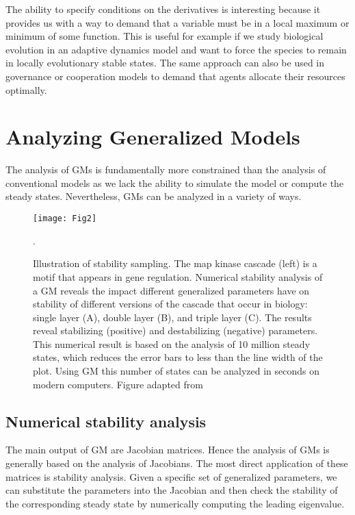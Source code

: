 \documentclass{article}
\begin{document}
The ability to specify conditions on the derivatives is interesting because it provides us with a way to demand that a variable must be in a local maximum or minimum of some function. This is useful for example if we study biological evolution in an adaptive dynamics model \citep{allen2013adaptive} and want to force the species to remain in locally evolutionary stable states. The same approach can also be used in governance or cooperation models to demand that agents allocate their resources optimally.   


\section{Analyzing Generalized Models}\label{secAnalysis}
The analysis of GMs is fundamentally more constrained than the analysis of conventional models as we lack the ability to simulate the model or compute the steady states. Nevertheless, GMs can be analyzed in a variety of ways. 

\begin{figure}
    \centering
    \texttt{[image: Fig2]}
    \caption{Illustration of stability sampling. The map kinase cascade (left) is a motif that appears in gene regulation. Numerical stability analysis of a GM reveals the impact different generalized parameters have on stability of different versions of the cascade that occur in biology: single layer (A), double layer (B), and triple layer (C). The results reveal stabilizing (positive) and destabilizing (negative) parameters. This numerical result is based on the analysis of 10 million steady states, which reduces the error bars to less than the line width of the plot. Using GM this number of states can be analyzed in seconds on modern computers. Figure adapted from \cite{Zumsande2010JTB}}.
    \label{figzumsande}
\end{figure}


\subsection{Numerical stability analysis} 
The main output of GM are Jacobian matrices. Hence the analysis of GMs is generally based on the analysis of Jacobians. The most direct application of these matrices is stability analysis. Given a specific set of generalized parameters, we can substitute the parameters into the Jacobian and then check the stability of the corresponding steady state by numerically computing the leading eigenvalue. 
\end{document}
